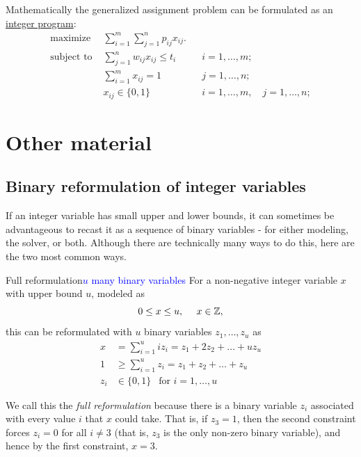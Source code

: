 {Mathematically the generalized assignment problem can be formulated as
an \href{Integer_programming}{integer program}:
\begin{align} \text{maximize } &
\sum_{i=1}^m\sum_{j=1}^n
p_{ij} x_{ij}. \\
\text{subject to } & \sum_{j=1}^n
w_{ij} x_{ij} \le t_i & & i=1,
\ldots, m; \\ &
\sum_{i=1}^m x_{ij} = 1 & & j=1,
\ldots, n; \\ & x_{ij}
\in \{0,1\} & & i=1,
\ldots, m, \quad j=1,
\ldots, n; \end{align}

\section{Other material}

\subsection{Binary reformulation of integer variables}
If an integer variable has small upper and lower bounds, it can sometimes be advantageous to recast it as a sequence of binary variables - for either modeling, the solver, or both.   Although there are technically many ways to do this, here are the two most common ways.

\begin{general}{Full reformulation}{\textcolor{blue}{$u$ many binary variables}}
\label{general:full-reformulation}
For a non-negative integer variable $x$ with upper bound $u$, modeled as 
\begin{equation}
0 \leq x \leq u, \ \ \ \ x \in {\mathbb{Z}},
\end{equation}
this can be reformulated with $u$ binary variables $z_1, \dots, z_u$ as 
\begin{equation}
\begin{split}
x & = \sum_{i=1}^u i z_i = z_1 + 2 z_2 + \dots + u z_u\\
1 & \geq \sum_{i=1}^u z_i = z_1 + z_2 + \dots + z_u\\
z_i & \in \{0,1\} \ \ \text{ for } i=1, \dots, u
\end{split}
\end{equation}
\end{general}
We call this the \emph{full reformulation} because there is a binary variable $z_i$ associated with every value $i$ that $x$ could take.  That is, if $z_3 = 1$, then the second constraint forces $z_i = 0$ for all $i \neq 3$ (that is, $z_3$ is the only non-zero binary variable), and hence by the first constraint, $x = 3$.

}
